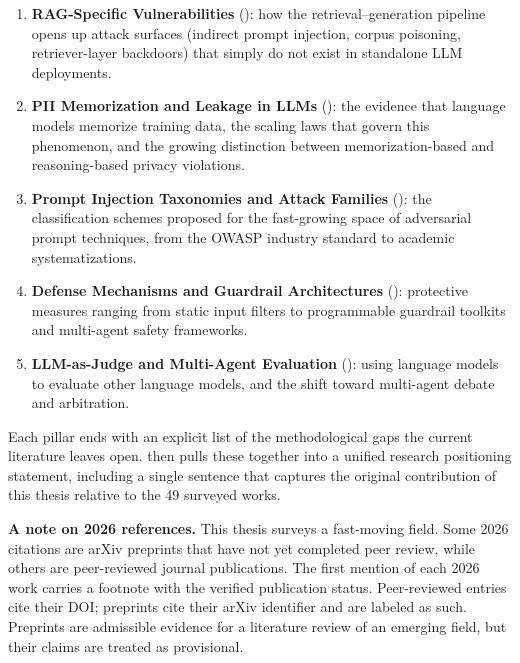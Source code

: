 \begin{enumerate}[leftmargin=2em, itemsep=3pt]
  \item \textbf{RAG-Specific Vulnerabilities} (): how the retrieval--generation pipeline opens up attack surfaces (indirect prompt injection, corpus poisoning, retriever-layer backdoors) that simply do not exist in standalone LLM deployments.
  \item \textbf{PII Memorization and Leakage in LLMs} (): the evidence that language models memorize training data, the scaling laws that govern this phenomenon, and the growing distinction between memorization-based and reasoning-based privacy violations.
  \item \textbf{Prompt Injection Taxonomies and Attack Families} (): the classification schemes proposed for the fast-growing space of adversarial prompt techniques, from the OWASP industry standard to academic systematizations.
  \item \textbf{Defense Mechanisms and Guardrail Architectures} (): protective measures ranging from static input filters to programmable guardrail toolkits and multi-agent safety frameworks.
  \item \textbf{LLM-as-Judge and Multi-Agent Evaluation} (): using language models to evaluate other language models, and the shift toward multi-agent debate and arbitration.
\end{enumerate}

Each pillar ends with an explicit list of the methodological gaps the current literature leaves open.  then pulls these together into a unified research positioning statement, including a single sentence that captures the original contribution of this thesis relative to the 49 surveyed works.

\begin{notebox}
\textbf{A note on 2026 references.} This thesis surveys a fast-moving field. Some 2026 citations are arXiv preprints that have not yet completed peer review, while others are peer-reviewed journal publications. The first mention of each 2026 work carries a footnote with the verified publication status. Peer-reviewed entries cite their DOI; preprints cite their arXiv identifier and are labeled as such. Preprints are admissible evidence for a literature review of an emerging field, but their claims are treated as provisional.
\end{notebox}



